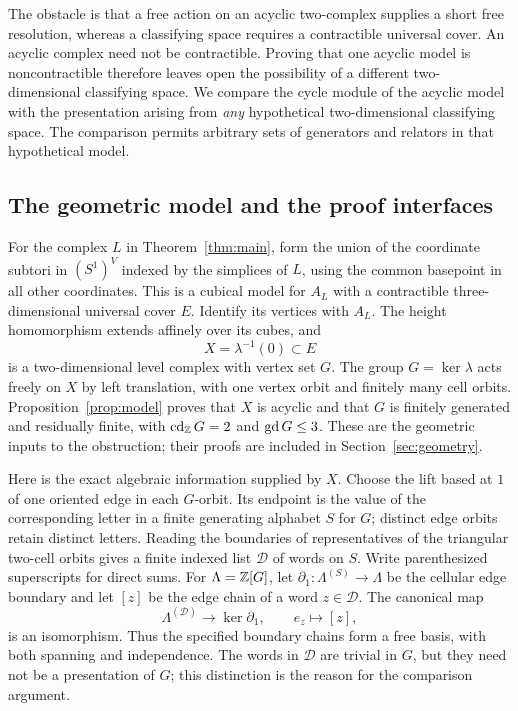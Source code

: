 The obstacle is that a free action on an acyclic two-complex supplies a short free resolution, whereas a classifying space requires a contractible universal cover. An acyclic complex need not be contractible. Proving that one acyclic model is noncontractible therefore leaves open the possibility of a different two-dimensional classifying space. We compare the cycle module of the acyclic model with the presentation arising from \emph{any} hypothetical two-dimensional classifying space. The comparison permits arbitrary sets of generators and relators in that hypothetical model.

\subsection*{The geometric model and the proof interfaces}

For the complex $L$ in Theorem~\ref{thm:main}, form the union of the coordinate subtori in $(S^1)^V$ indexed by the simplices of $L$, using the common basepoint in all other coordinates. This is a cubical model for $A_L$ with a contractible three-dimensional universal cover $E$. Identify its vertices with $A_L$. The height homomorphism extends affinely over its cubes, and
\[
 X=\lambda^{-1}(0)\subset E
\]
is a two-dimensional level complex with vertex set $G$. The group $G=\ker\lambda$ acts freely on $X$ by left translation, with one vertex orbit and finitely many cell orbits. Proposition~\ref{prop:model} proves that $X$ is acyclic and that $G$ is finitely generated and residually finite, with $\operatorname{cd}_{\mathbb Z} G=2$ and $\operatorname{gd} G\le3$. These are the geometric inputs to the obstruction; their proofs are included in Section~\ref{sec:geometry}.

Here is the exact algebraic information supplied by $X$. Choose the lift based at $1$ of one oriented edge in each $G$-orbit. Its endpoint is the value of the corresponding letter in a finite generating alphabet $S$ for $G$; distinct edge orbits retain distinct letters. Reading the boundaries of representatives of the triangular two-cell orbits gives a finite indexed list $\mathcal D$ of words on $S$. Write parenthesized superscripts for direct sums. For $\Lambda=\mathbb Z[G]$, let $\partial_1:\Lambda^{(S)}\to\Lambda$ be the cellular edge boundary and let $[z]$ be the edge chain of a word $z\in\mathcal D$. The canonical map
\[
 \Lambda^{(\mathcal D)}\longrightarrow\ker\partial_1,
 \qquad e_z\longmapsto[z],
\]
is an isomorphism. Thus the specified boundary chains form a free basis, with both spanning and independence. The words in $\mathcal D$ are trivial in $G$, but they need not be a presentation of $G$; this distinction is the reason for the comparison argument.

